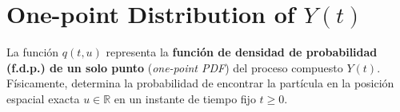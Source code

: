 
\section{One-point Distribution of $Y(t)$}
\vspace{0.6cm}

\begin{definicion}
La función $q(t, u)$ representa la \textbf{función de densidad de probabilidad (f.d.p.) de un solo punto} (\textit{one-point PDF}) del proceso compuesto $Y(t)$. Físicamente, determina la probabilidad de encontrar la partícula en la posición espacial exacta $u \in \mathbb{R}$ en un instante de tiempo fijo $t \ge 0$.
\end{definicion}

